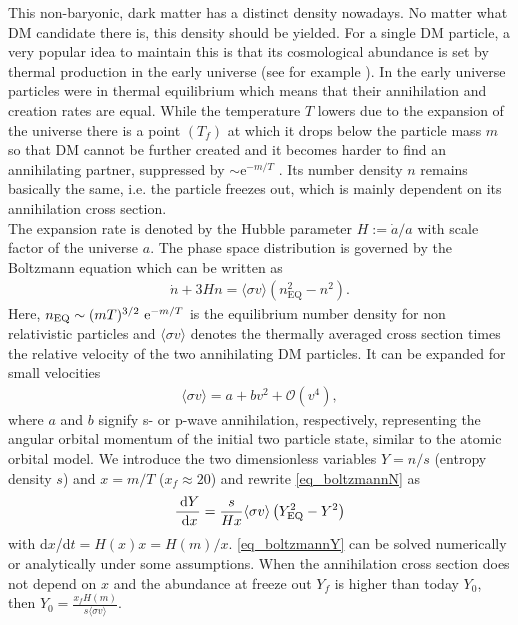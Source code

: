 This non-baryonic, dark matter has a distinct density nowadays. No matter what DM candidate there is, this density should be
yielded. For a single DM particle, a very popular idea to maintain this is that its cosmological abundance is set by thermal production in the 
early universe (see for example \cite{DM-EvCaDo}). In the early universe particles were in thermal equilibrium which means that their annihilation and
creation rates are equal. 
While the temperature $T$ lowers due to the expansion of the universe there is a point $(T_f)$ at which it drops below the particle mass $m$ so that 
DM cannot be further created 
and it becomes harder to find an annihilating partner, suppressed by $\sim \text{e}^{-m/T}$ \cite{LectDMLis}. Its number density $n$ 
remains basically the same, i.e. the particle freezes out, which is mainly dependent on its annihilation cross section.\\
The expansion rate is denoted by the Hubble parameter $H:=\dot{a}/a$ with scale factor of the universe $a$. The phase space distribution is 
governed by the Boltzmann equation \cite{DM-EvCaDo} which can be written as 
\begin{align}
 \dot{n} + 3Hn = \langle \sigma v\rangle \left(n_\text{EQ}^2 - n^2\right).
 \label{eq_boltzmannN}
\end{align}
Here, $n_\text{EQ}\sim (mT)^{3/2}\ \text{e}^{-m/T}$ is the equilibrium number density for non relativistic particles and $\langle\sigma v\rangle$ denotes 
the thermally averaged cross section times the relative velocity of the two annihilating DM particles. It can be expanded for small velocities
\begin{align}
 \langle \sigma v \rangle = a + bv^2 + \mathcal{O}(v^4),
\end{align}
where $a$ and $b$ signify s- or p-wave annihilation, respectively, representing the angular orbital momentum of the initial two particle state,
similar to the atomic orbital model. We introduce the two dimensionless variables $Y=n/s$ (entropy density $s$) and $x=m/T$ ($x_f\approx 20$) 
and rewrite \eqref{eq_boltzmannN} as
\begin{align}
 \frac{\; \mathrm{d} Y}{\; \mathrm{d} x} = \frac{s}{Hx}\langle \sigma v\rangle \left(Y_\text{EQ}^2 - Y^2\right)
 \label{eq_boltzmannY}
\end{align}
with d$x$/d$t = H(x) x = H(m)/x$. \eqref{eq_boltzmannY} can be solved numerically or analytically under some assumptions. When the annihilation
cross section does not depend on $x$ and the abundance at freeze out $Y_f$ is higher than today $Y_0$, then $Y_0=\frac{x_fH(m)}{s \langle \sigma v\rangle}$.
